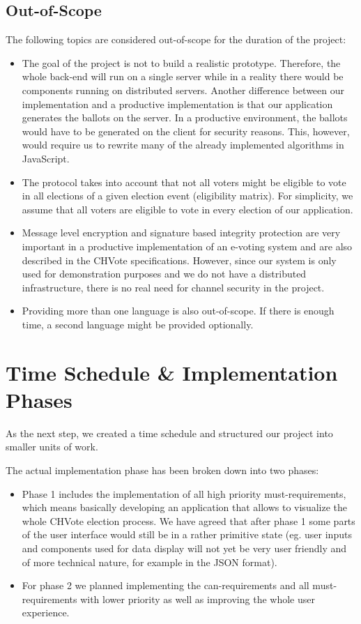 \subsection{Out-of-Scope}
The following topics are considered out-of-scope for the duration of the project:
\begin{itemize}
	\item The goal of the project is not to build a realistic prototype. Therefore, the whole back-end will run on a single server while in a reality there would be components running on distributed servers. Another difference between our implementation and a productive implementation is that our application generates the ballots on the server. In a productive environment, the ballots would have to be generated on the client for security reasons. This, however, would require us to rewrite many of the already implemented algorithms in JavaScript.
	\item The protocol takes into account that not all voters might be eligible to vote in all elections of a given election event (eligibility matrix). For simplicity, we assume that all voters are eligible to vote in every election of our application.
	\item Message level encryption and signature based integrity protection are very important in a productive implementation of an e-voting system and are also described in the CHVote specifications. However, since our system is only used for demonstration purposes and we do not have a distributed infrastructure, there is no real need for channel security in the project.
	\item Providing more than one language is also out-of-scope. If there is enough time, a second language might be provided optionally.
\end{itemize}

\section{Time Schedule \& Implementation Phases}
As the next step, we created a time schedule and structured our project into smaller units of work.

The actual implementation phase has been broken down into two phases:

\begin{itemize}
	\item Phase 1 includes the implementation of all high priority must-requirements, which means basically developing an application that allows to visualize the whole CHVote election process. We have agreed that after phase 1 some parts of the user interface would still be in a rather primitive state (eg. user inputs and components used for data display will not yet be very user friendly and of more technical nature, for example in the JSON format).
	\item For phase 2 we planned implementing the can-requirements and all must-requirements with lower priority as well as improving the whole user experience.
\end{itemize}

